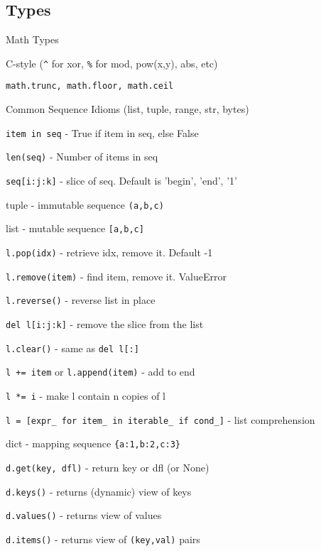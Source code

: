 \documentclass[10pt,a4paper]{article}
\begin{document}
\begin{multicols*}{3}

\section{Types}

Math Types 

\begin{compactitem}
    \item C-style (\verb|^| for xor, \verb|%| for mod, pow(x,y), abs, etc)
    \item \verb|math.trunc, math.floor, math.ceil| 
\end{compactitem}

\noindent Common Sequence Idioms (list, tuple, range, str, bytes)

\begin{compactitem}
    \item \verb|item in seq| - True if item in seq, else False
    \item \verb|len(seq)| - Number of items in seq
    \item \verb|seq[i:j:k]| - slice of seq. Default is 'begin', 'end', '1'
\end{compactitem}

\noindent tuple - immutable sequence \verb|(a,b,c)|

\noindent list - mutable sequence \verb|[a,b,c]|

\begin{compactitem}
    \item \verb|l.pop(idx)| - retrieve idx, remove it.  Default -1
    \item \verb|l.remove(item)| - find item, remove it.  ValueError
    \item \verb|l.reverse()| - reverse list in place
    \item \verb|del l[i:j:k]| - remove the slice from the list
    \item \verb|l.clear()| - same as \verb|del l[:]|
    \item \verb|l += item| or \verb|l.append(item)| - add to end
    \item \verb|l *= i| - make l contain n copies of l
    \item \verb|l = [expr_ for item_ in iterable_ if cond_]| - list comprehension
\end{compactitem}

\noindent dict - mapping sequence \verb|{a:1,b:2,c:3}|

\begin{compactitem}
    \item \verb|d.get(key, dfl)| - return key or dfl (or None)
    \item \verb|d.keys()| - returns (dynamic) view of keys
    \item \verb|d.values()| - returns view of values
    \item \verb|d.items()| - returns view of \verb|(key,val)| pairs
\end{compactitem}


\end{multicols*}
\end{document}
